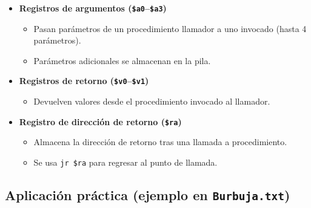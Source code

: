 \documentclass{article}
\begin{document}
\begin{itemize}
    \item \textbf{Registros de argumentos (\texttt{\$a0}--\texttt{\$a3})}  
    \begin{itemize}
        \item Pasan parámetros de un procedimiento llamador a uno invocado (hasta 4 parámetros).
        \item Parámetros adicionales se almacenan en la pila.
    \end{itemize}
    
    \item \textbf{Registros de retorno (\texttt{\$v0}--\texttt{\$v1})} 
    \begin{itemize}
        \item Devuelven valores desde el procedimiento invocado al llamador.
    \end{itemize}
    
    \item \textbf{Registro de dirección de retorno (\texttt{\$ra})} 
    \begin{itemize}
        \item Almacena la dirección de retorno tras una llamada a procedimiento.
        \item Se usa \texttt{jr \$ra} para regresar al punto de llamada.
    \end{itemize}
\end{itemize}

\subsection*{Aplicación práctica (ejemplo en \texttt{Burbuja.txt})}
\end{document}
